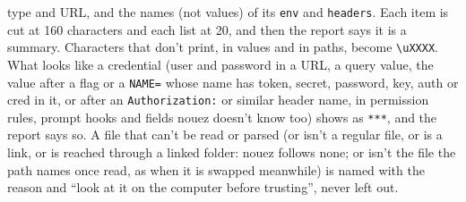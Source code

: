 \documentclass[10pt,a4paper]{article}
\newcommand{\code}[1]{\texttt{#1}}
\begin{document}
type and URL, and the names (not values) of its \code{env} and \code{headers}. Each item is cut at
160 characters and each list at 20, and then the report says it is a summary. Characters that don't
print, in values and in paths, become \code{\textbackslash{}uXXXX}. What looks like a credential (user and password in a
URL, a query value, the value after a flag or a \code{NAME=} whose name has token, secret,
password, key, auth or cred in it, or after an \code{Authorization:} or similar header name, in
permission rules, prompt hooks and fields nouez doesn't know too) shows as \code{***}, and the
report says so. A file that can't be read or parsed (or isn't a regular file, or is a link, or is
reached through a linked folder: nouez follows none; or isn't the file the path names once read,
as when it is swapped meanwhile) is named with the reason and ``look at it on the computer
before trusting'', never left out.
\end{document}
